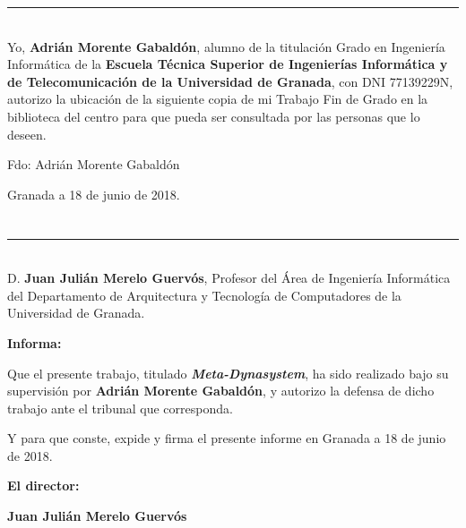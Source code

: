 \noindent\rule[-1ex]{\textwidth}{2pt}\\[4.5ex]

Yo, \textbf{Adrián Morente Gabaldón}, alumno de la titulación Grado en Ingeniería Informática de la \textbf{Escuela Técnica Superior
de Ingenierías Informática y de Telecomunicación de la Universidad de Granada}, con DNI 77139229N, autorizo la
ubicación de la siguiente copia de mi Trabajo Fin de Grado en la biblioteca del centro para que pueda ser
consultada por las personas que lo deseen.

\vspace{6cm}

\noindent Fdo: Adrián Morente Gabaldón

\vspace{2cm}

\begin{flushright}
Granada a 18 de junio de 2018.
\end{flushright}


\chapter*{}
\thispagestyle{empty}

\noindent\rule[-1ex]{\textwidth}{2pt}\\[4.5ex]

D. \textbf{Juan Julián Merelo Guervós}, Profesor del Área de Ingeniería Informática del Departamento de Arquitectura y Tecnología de Computadores de la Universidad de Granada.

\vspace{0.5cm}

\textbf{Informa:}

\vspace{0.5cm}

Que el presente trabajo, titulado \textit{\textbf{Meta-Dynasystem}}, ha sido realizado bajo su supervisión por \textbf{Adrián Morente Gabaldón}, y autorizo la defensa de dicho trabajo ante el tribunal que corresponda.

\vspace{0.5cm}

Y para que conste, expide y firma el presente informe en Granada a 18 de junio de 2018.

\vspace{1cm}

\textbf{El director:}

\vspace{5cm}

\noindent \textbf{Juan Julián Merelo Guervós}

